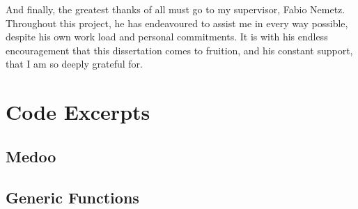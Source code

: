 \documentclass[11pt,openright,a4paper]{report}
\begin{document}
And finally, the greatest thanks of all must go to my supervisor, Fabio Nemetz. Throughout this project, he has endeavoured to assist me in every way possible, despite his own work load and personal commitments. 
It is with his endless encouragement that this dissertation comes to fruition, and his constant support, that I am so deeply grateful for.
\newpage


\setcounter{page}{1}

























\appendix


 \label{appendixusabilitystudy}



\chapter{Code Excerpts}

\begin{landscape}
\begin{multicols}{2}
\section{Medoo} \label{medoocode}

\end{multicols}
\end{landscape}

\begin{landscape}
\begin{multicols}{2}
\section{Generic Functions} \label{snippetgrab}

\end{multicols}
\end{landscape}
\end{document}
